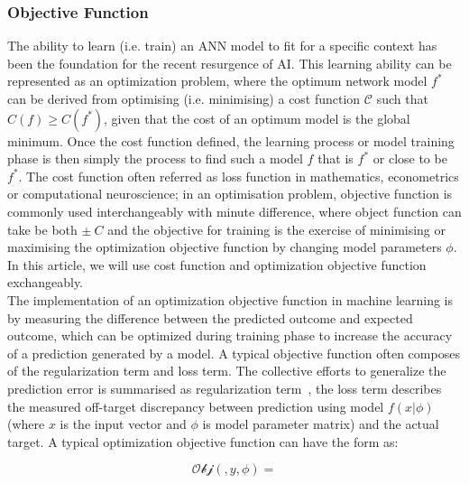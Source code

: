 \subsubsection{Objective Function}
The ability to learn (i.e. train) an ANN model to fit for a specific context has been the foundation for the recent resurgence of AI. This learning ability can be represented as an optimization problem, where the optimum network model $f^*$ can be derived from optimising (i.e. minimising) a cost function $\mathcal{C}$ such that $C(f) \geq C(f^*)$, given that the cost of an optimum model is the global minimum. Once the cost function defined, the learning process or model training phase is then simply the process to find such a model $f$ that is $f^*$ or close to be $f^*$. The cost function often referred as loss function in mathematics, econometrics or computational neuroscience; in an optimisation problem, objective function is commonly used interchangeably with minute difference, where object function can take be both $\pm~C$ and the objective for training is the exercise of minimising or maximising the optimization objective function by changing model parameters $\phi$. In this article, we will use cost function and optimization objective function exchangeably.
\\
The implementation of an optimization objective function in machine learning is by measuring the difference between the predicted outcome and expected outcome, which can be optimized during training phase to increase the accuracy of a prediction generated by a model. A typical objective function often composes of the regularization term and loss term. The collective efforts to generalize the prediction error is summarised as regularization term~\cite{goodfellow_2015}, the loss term describes the measured off-target discrepancy between prediction using model $f(x|\phi)$ (where $x$ is the input vector and $\phi$ is model parameter matrix) and the actual target. A typical optimization objective function can have the form as:

\begin{equation}
    \mathcal{Obj}(,y,\phi) = 
\end{equation}